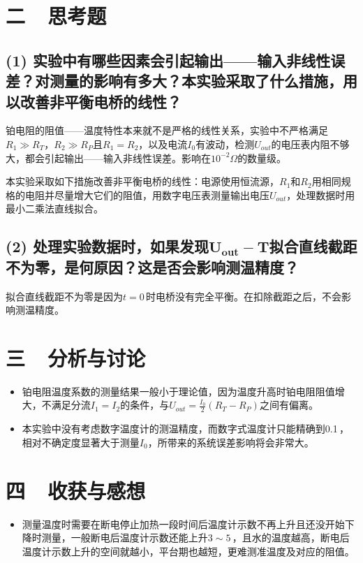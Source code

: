 \documentclass[a4paper]{ctexbook}
\begin{document}
    \bigskip
    \section*{ 二\ \ 思考题}

    \subsection*{(1) 实验中有哪些因素会引起输出——输入非线性误差？对测量的影响有多大？本实验采取了什么措施，用以改善非平衡电桥的线性？}

    铂电阻的阻值——温度特性本来就不是严格的线性关系，实验中不严格满足$R_1 \gg R_T$，$R_2 \gg R_P$且$R_1 = R_2$，以及电流$I_0$有波动，检测$U_{out}$的电压表内阻不够大，都会引起输出——输入非线性误差。影响在$10^{-2}\Omega$的数量级。

    本实验采取如下措施改善非平衡电桥的线性：电源使用恒流源，$R_1$和$R_2$用相同规格的电阻并尽量增大它们的阻值，用数字电压表测量输出电压$U_{out}$，处理数据时用最小二乘法直线拟合。

    \medskip
    \subsection*{(2) 处理实验数据时，如果发现$\boldsymbol{U_{out}-T}$拟合直线截距不为零，是何原因？这是否会影响测温精度？}

    拟合直线截距不为零是因为$t=0$\,\textcelsius 时电桥没有完全平衡。在扣除截距之后，不会影响测温精度。

    \bigskip
    \section*{ 三\ \ 分析与讨论}

    \begin{itemize}
        \item[1.] 铂电阻温度系数的测量结果一般小于理论值，因为温度升高时铂电阻阻值增大，不满足分流$I_1=I_2$的条件，与$U_{out}=\frac{I_0}{2}(R_T-R_P)$之间有偏离。
         
        \medskip
        \item[2.] 本实验中没有考虑数字温度计的测温精度，而数字式温度计只能精确到0.1\,\textcelsius ，相对不确定度显著大于测量$I_0$，所带来的系统误差影响将会非常大。

    \end{itemize}

    \bigskip
    \section*{ 四\ \ 收获与感想}

    \begin{itemize}
        \item[1.] 测量温度时需要在断电停止加热一段时间后温度计示数不再上升且还没开始下降时测量，一般断电后温度计示数还能上升$3\sim 5\,$\textcelsius ，且水的温度越高，断电后温度计示数上升的空间就越小，平台期也越短，更难测准温度及对应的阻值。
    \end{itemize}
\end{document}
